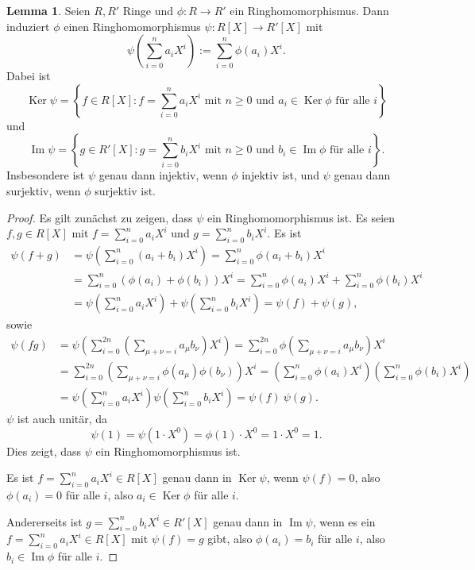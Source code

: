 \documentclass[a4paper,10pt]{article}
\theoremstyle{definition}
\newtheorem{lem}[beh]{Lemma}
\newcommand{\Img}{\operatorname{Im}}
\newcommand{\Ker}{\operatorname{Ker}}
\begin{document}
\begin{lem} \label{lem: ringhomo polynom}
 Seien $R, R'$ Ringe und $\phi: R \rightarrow R'$ ein Ringhomomorphismus. Dann induziert $\phi$ einen Ringhomomorphismus $\psi: R[X] \rightarrow R'[X]$ mit
  \[
   \psi\left( \sum_{i=0}^n a_i X^i \right) := \sum_{i=0}^n \phi(a_i) X^i.
  \]
  Dabei ist
  \[
   \Ker \psi = \left\{f \in R[X] : f = \sum_{i=0}^n a_i X^i \text{ mit } n \geq 0 \text{ und } a_i \in \Ker \phi \text{ für alle }i\right\}
  \]
  und
  \[
   \Img \psi = \left\{g \in R'[X] : g = \sum_{i=0}^n b_i X^i \text{ mit } n \geq 0 \text{ und } b_i \in \Img \phi \text{ für alle }i\right\}.
  \]
  Insbesondere ist $\psi$ genau dann injektiv, wenn $\phi$ injektiv ist, und $\psi$ genau dann surjektiv, wenn $\phi$ surjektiv ist.
\end{lem}
\begin{proof}
 Es gilt zunächst zu zeigen, dass $\psi$ ein Ringhomomorphismus ist. Es seien $f,g \in R[X]$ mit $f=\sum_{i=0}^n a_i X^i$ und $g=\sum_{i=0}^n b_i X^i$. Es ist
 \begin{align*}
  \psi(f+g)
  &= \psi\left( \sum_{i=0}^n (a_i+b_i) X^i \right)
  = \sum_{i=0}^n \phi(a_i+b_i) X^i \\
  &= \sum_{i=0}^n (\phi(a_i) + \phi(b_i)) X^i
  = \sum_{i=0}^n \phi(a_i) X^i  +  \sum_{i=0}^n \phi(b_i) X^i \\
  &= \psi\left( \sum_{i=0}^n a_i X^i \right) + \psi\left( \sum_{i=0}^n b_i X^i \right)
  = \psi(f) + \psi(g),
 \end{align*}
 sowie
 \begin{align*}
  \psi(f g)
  &= \psi\left( \sum_{i=0}^{2n} \left(\sum_{\mu+\nu=i} a_\mu b_\nu \right) X^i \right)
  = \sum_{i=0}^{2n} \phi \left(\sum_{\mu+\nu=i} a_\mu b_\nu \right) X^i \\
  &= \sum_{i=0}^{2n} \left(\sum_{\mu+\nu=i} \phi(a_\mu) \phi(b_\nu) \right) X^i
  = \left( \sum_{i=0}^n \phi(a_i) X^i \right)\left( \sum_{i=0}^n \phi(b_i) X^i \right)\\
  &= \psi \left( \sum_{i=0}^n a_i X^i \right) \psi \left( \sum_{i=0}^n b_i X^i \right)
  = \psi(f)\ \psi(g).
 \end{align*}
 $\psi$ ist auch unitär, da
 \[
  \psi(1) = \psi(1 \cdot X^0) = \phi(1) \cdot X^0 = 1 \cdot X^0 = 1.
 \]
 Dies zeigt, dass $\psi$ ein Ringhomomorphismus ist.
 
 Es ist $f = \sum_{i=0}^n a_i X^i \in R[X]$ genau dann in $\Ker \psi$, wenn $\psi(f) = 0$, also $\phi(a_i) = 0$ für alle $i$, also $a_i \in \Ker \phi$ für alle $i$.
 
 Andererseits ist $g = \sum_{i=0}^n b_i X^i \in R'[X]$ genau dann in $\Img \psi$, wenn es ein $f = \sum_{i=0}^n a_i X^i \in R[X]$ mit $\psi(f) = g$ gibt, also $\phi(a_i) = b_i$ für alle $i$, also $b_i \in \Img \phi$ für alle $i$.
\end{proof}
\end{document}
